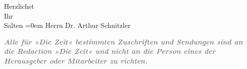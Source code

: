 \pstart
           Herzlichst {\\[\baselineskip]}Ihr {\\[\baselineskip]}\spacefill\mbox{Salten}\pend
           \leftskip=0em{}
\pstart
           \noindent{}Herrn Dr. Arthur Schnitzler\pend
           
\pstart
           \pend
           
\pstart
           \textcolor{gray}{\textbf{\emph{Alle für »Die Zeit«
                        bestimmten Zuschriften und Sendungen sind an die Redaction »Die Zeit« und \textbf{nicht} an die
                        Person eines der Herausgeber oder Mitarbeiter zu richten.}}}\pend
           \endnumbering{}  
      